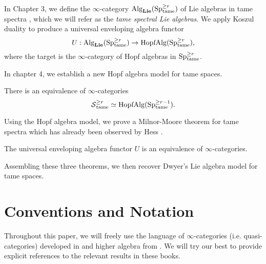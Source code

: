 In Chapter 3, we define the $\infty$-category $\operatorname{Alg}_{\mathbf{Lie}}(\operatorname{Sp}^{\geq r}_{\operatorname{\operatorname{tame}}})$ of Lie algebras in tame spectra , which we will refer as the \emph{tame spectral Lie algebras}.
We apply Koszul duality to produce a universal enveloping algebra functor
$$
U:\operatorname{Alg}_{\mathbf{Lie}}(\operatorname{Sp}^{\geq r}_{\operatorname{\operatorname{tame}}}) \to \operatorname{HopfAlg}(\operatorname{Sp}^{\geq r}_{\operatorname{\operatorname{tame}}}),
$$ 
where the target is the $\infty$-category of Hopf algebras in $\operatorname{Sp}^{\geq r}_{\operatorname{\operatorname{tame}}}$. 

In chapter 4, we establish a new Hopf algebra model for tame spaces.
\begin{thmx}
\label{Theorem B}
There is an equivalence of $\infty$-categories 
$$
\operatorname{\mathcal{S}}^{\geq r}_{\operatorname{\operatorname{tame}}} 
\simeq
\operatorname{HopfAlg}(\operatorname{Sp}^{\geq r-1}_{\operatorname{\operatorname{tame}}}).
$$
\end{thmx}
Using the Hopf algebra model, we prove a Milnor-Moore theorem for tame spectra which has already been observed by Hess \cite[Theorem 6.6]{HessMildandTame}.
\begin{thmx}
\label{Theorem C}
The universal enveloping algebra functor $U$ is an equivalence of $\infty$-categories.
\end{thmx}


Assembling these three theorems, we then recover Dwyer's Lie algebra model for tame spaces.




\section{Conventions and Notation}
Throughout this paper, we will freely use the language of $\infty$-categories (i.e. quasi-categories) developed in \cite{HTT} and higher algebra from \cite{HA}.
We will try our best to provide explicit references to the relevant results in these books.

